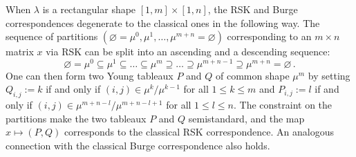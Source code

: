 \documentclass[a4paper,reqno,12pt]{amsart}
\theoremstyle{plain}
\theoremstyle{definition}
\newcommand{\1}{\mathbbm{1}}
\renewcommand{\emptyset}{\varnothing}
\begin{document}
When $\lambda$ is a rectangular shape $[1,m] \times [1,n]$, the RSK and Burge correspondences degenerate to the classical ones in the following way.
The sequence of partitions $(\emptyset = \mu^0, \mu^1,\dots, \mu^{m+n} = \emptyset)$ corresponding to an $m\times n$ matrix $x$ via RSK can be split into an ascending and a descending sequence:
\[
\emptyset = \mu^0 \subseteq \mu^1 \subseteq \dots \subseteq \mu^m \supseteq \dots \supseteq \mu^{m+n-1} \supseteq \mu^{m+n} = \emptyset \, .
\]
One can then form two Young tableaux $P$ and $Q$ of common shape $\mu^m$ by setting $Q_{i,j} := k$ if and only if $(i,j)\in \mu^k / \mu^{k-1}$ for all $1\leq k\leq m$ and $P_{i,j} := l$ if and only if $(i,j)\in \mu^{m+n-l} / \mu^{m+n-l+1}$ for all $1\leq l\leq n$.
The constraint on the partitions make the two tableaux $P$ and $Q$ semistandard, and the map $x\mapsto (P,Q)$ corresponds to the classical RSK correspondence.
An analogous connection with the classical Burge correspondence also holds.


\vskip 4mm


\printbibliography
\end{document}
